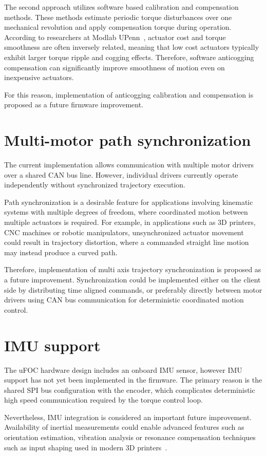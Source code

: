 The second approach utilizes software based calibration and compensation methods.
These methods estimate periodic torque disturbances over one mechanical revolution and apply compensation torque during operation.
According to researchers at Modlab UPenn~\cite{anticogging}, actuator cost and torque smoothness are often inversely related, 
meaning that low cost actuators typically exhibit larger torque ripple and cogging effects.
Therefore, software anticogging compensation can significantly improve smoothness of motion even on inexpensive actuators.

For this reason, implementation of anticogging calibration and compensation is proposed as a future firmware improvement.


\section{Multi-motor path synchronization}
The current implementation allows communication with multiple motor drivers over a shared CAN bus line.
However, individual drivers currently operate independently without synchronized trajectory execution.

Path synchronization is a desirable feature for applications involving kinematic systems with multiple degrees of freedom,
where coordinated motion between multiple actuators is required.
For example, in applications such as 3D printers, CNC machines or robotic manipulators,
unsynchronized actuator movement could result in trajectory distortion, where a commanded straight line motion may instead produce a curved path.

Therefore, implementation of multi axis trajectory synchronization is proposed as a future improvement.
Synchronization could be implemented either on the client side by distributing time aligned commands,
or preferably directly between motor drivers using CAN bus communication for deterministic coordinated motion control.

\section{IMU support}
The uFOC hardware design includes an onboard IMU sensor, however IMU support has not yet been implemented in the firmware.
The primary reason is the shared SPI bus configuration with the encoder,
which complicates deterministic high speed communication required by the torque control loop.

Nevertheless, IMU integration is considered an important future improvement.
Availability of inertial measurements could enable advanced features such as orientation estimation,
vibration analysis or resonance compensation techniques such as input shaping used in modern 3D printers~\cite{klipper_resonance}.

